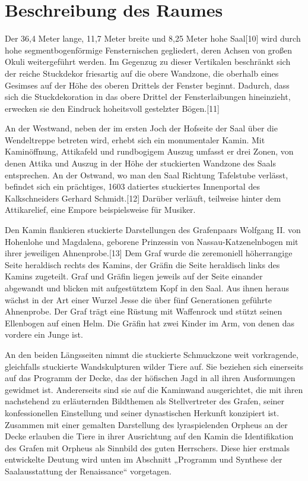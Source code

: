 \documentclass[
  a4paper,
  openany]{book}
\begin{document}
\section{\texorpdfstring{\textbf{Beschreibung des
Raumes}}{Beschreibung des Raumes}}\label{beschreibung-des-raumes}

Der 36,4 Meter lange, 11,7 Meter breite und 8,25 Meter hohe Saal{[}10{]}
wird durch hohe segmentbogenförmige Fensternischen gegliedert, deren
Achsen von großen Okuli weitergeführt werden. Im Gegenzug zu dieser
Vertikalen beschränkt sich der reiche Stuckdekor friesartig auf die
obere Wandzone, die oberhalb eines Gesimses auf der Höhe des oberen
Drittels der Fenster beginnt. Dadurch, dass sich die Stuckdekoration in
das obere Drittel der Fensterlaibungen hineinzieht, erwecken sie den
Eindruck hoheitsvoll gestelzter Bögen.{[}11{]}

An der Westwand, neben der im ersten Joch der Hofseite der Saal über die
Wendeltreppe betreten wird, erhebt sich ein monumentaler Kamin. Mit
Kaminöffnung, Attikafeld und rundbogigem Auszug umfasst er drei Zonen,
von denen Attika und Auszug in der Höhe der stuckierten Wandzone des
Saals entsprechen. An der Ostwand, wo man den Saal Richtung Tafelstube
verlässt, befindet sich ein prächtiges, 1603 datiertes stuckiertes
Innenportal des Kalkschneiders Gerhard Schmidt.{[}12{]} Darüber
verläuft, teilweise hinter dem Attikarelief, eine Empore beispielsweise
für Musiker.

Den Kamin flankieren stuckierte Darstellungen des Grafenpaars Wolfgang
II. von Hohenlohe und Magdalena, geborene Prinzessin von
Nassau-Katzenelnbogen mit ihrer jeweiligen Ahnenprobe.{[}13{]} Dem Graf
wurde die zeremoniell höherrangige Seite heraldisch rechts des Kamins,
der Gräfin die Seite heraldisch links des Kamins zugeteilt. Graf und
Gräfin liegen jeweils auf der Seite einander abgewandt und blicken mit
aufgestütztem Kopf in den Saal. Aus ihnen heraus wächst in der Art einer
Wurzel Jesse die über fünf Generationen geführte Ahnenprobe. Der Graf
trägt eine Rüstung mit Waffenrock und stützt seinen Ellenbogen auf einen
Helm. Die Gräfin hat zwei Kinder im Arm, von denen das vordere ein Junge
ist.

An den beiden Längsseiten nimmt die stuckierte Schmuckzone weit
vorkragende, gleichfalls stuckierte Wandskulpturen wilder Tiere auf. Sie
beziehen sich einerseits auf das Programm der Decke, das der höfischen
Jagd in all ihren Ausformungen gewidmet ist. Andererseits sind sie auf
die Kaminwand ausgerichtet, die mit ihren nachstehend zu erläuternden
Bildthemen als Stellvertreter des Grafen, seiner konfessionellen
Einstellung und seiner dynastischen Herkunft konzipiert ist. Zusammen
mit einer gemalten Darstellung des lyraspielenden Orpheus an der Decke
erlauben die Tiere in ihrer Ausrichtung auf den Kamin die Identifikation
des Grafen mit Orpheus als Sinnbild des guten Herrschers. Diese hier
erstmals entwickelte Deutung wird unten im Abschnitt „Programm und
Synthese der Saalausstattung der Renaissance`` vorgetagen.
\end{document}

